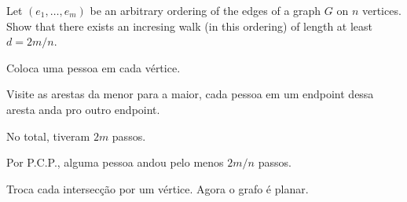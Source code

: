\documentclass[10pt, a4paper]{article}
\begin{document}
\newpage
\begin{prob}
	
\end{prob}


\newpage
\begin{prob}
	Let $(e_1, \dots, e_m)$ be an arbitrary ordering of the edges of a graph $G$ on $n$ vertices. Show that there exists an incresing walk (in this ordering) of length at least $d = 2m/n$.
\end{prob}

\begin{sk}
	Coloca uma pessoa em cada vértice.

	Visite as arestas da menor para a maior, cada pessoa em um endpoint dessa aresta anda pro outro endpoint.

	No total, tiveram $2m$ passos.

	Por P.C.P., alguma pessoa andou pelo menos $2m/n$ passos.
\end{sk}

\newpage
\begin{prob}
	
\end{prob}
\begin{sk}
	Troca cada intersecção por um vértice. Agora o grafo é planar.
\end{sk}
\end{document}
